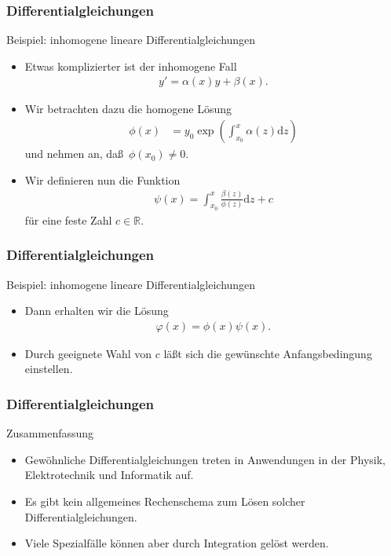 \documentclass{beamer}
\newcommand\dd{\mathrm d}
\newcommand\RR{\mathbb R}
\newcommand\bc[1]{\left({#1}\right)}
\renewcommand{\ae}{\"a}
\renewcommand{\oe}{\"o}
\newcommand{\ue}{\"u}
\newcommand{\mytitle}{Differentialgleichungen}
\begin{document}
\begin{frame}\frametitle{\mytitle}
	\begin{block}{Beispiel: inhomogene lineare Differentialgleichungen}
		\begin{itemize}
			\item Etwas komplizierter ist der inhomogene Fall
				\begin{align*}
					y'=\alpha(x)y+\beta(x).
				\end{align*}
			\item Wir betrachten dazu die homogene L\oe sung
				\begin{align*}
					\phi(x)&=y_0\exp\bc{\int_{x_0}^x\alpha(z)\dd z}
				\end{align*}
				und nehmen an, da\ss\ $\phi(x_0)\neq0$.
			\item Wir definieren nun die Funktion
				\begin{align*}
					\psi(x)=\int_{x_0}^x\frac{\beta(z)}{\phi(z)}\dd z+c
				\end{align*}
				f\ue r eine feste Zahl $c\in\RR$.
		\end{itemize}
	\end{block}
\end{frame}

\begin{frame}\frametitle{\mytitle}
	\begin{block}{Beispiel: inhomogene lineare Differentialgleichungen}
		\begin{itemize}
			\item Dann erhalten wir die L\oe sung
				\begin{align*}
					\varphi(x)=\phi(x)\psi(x).
				\end{align*}
			\item Durch geeignete Wahl von $c$ l\ae\ss t sich die gew\ue nschte Anfangsbedingung einstellen.
		\end{itemize}
	\end{block}
\end{frame}

\begin{frame}\frametitle{\mytitle}
	\begin{block}{Zusammenfassung}
		\begin{itemize}
			\item Gew\oe hnliche Differentialgleichungen treten in Anwendungen in der Physik, Elektrotechnik und Informatik auf.
			\item Es gibt kein allgemeines Rechenschema zum L\oe sen solcher Differentialgleichungen.
			\item Viele Spezialf\ae lle k\oe nnen aber durch Integration gel\oe st werden.
		\end{itemize}
	\end{block}
\end{frame}
\end{document}
